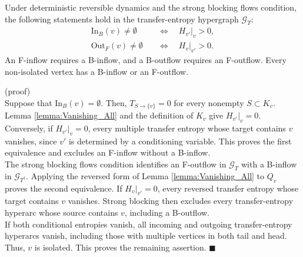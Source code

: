 \documentclass{comnet}%
\begin{document}
\begin{proposition}
 Under deterministic reversible dynamics and the strong blocking flows condition, the following statements hold in the transfer-entropy hypergraph $\mathcal G_T$:
\begin{equation}\begin{aligned}\label{eq:Local_Support}
 \text{In}_B(v)\ne\emptyset &\quad\Longleftrightarrow\quad H_{v'}|_v>0,\\
 \text{Out}_F(v)\ne\emptyset &\quad\Longleftrightarrow\quad H_v|_{v'}>0.
\end{aligned}\end{equation}
An F-inflow requires a B-inflow, and a B-outflow requires an F-outflow. Every non-isolated vertex has a B-inflow or an F-outflow.
 \label{prop:Strong_Blocking_Requirement}\end{proposition}
(proof)\\
Suppose that $\text{In}_B(v)=\emptyset$. Then, $T_{S\to\{v\}}=0$ for every nonempty $S\subset K_v$. Lemma \ref{lemma:Vanishing_All} and the definition of $K_v$ give $H_{v'}|_v=0$. Conversely, if $H_{v'}|_v=0$, every multiple transfer entropy whose target contains $v$ vanishes, since $v'$ is determined by a conditioning variable. This proves the first equivalence and excludes an F-inflow without a B-inflow.\\
The strong blocking flows condition identifies an F-outflow in $\mathcal G_T$ with a B-inflow in $\mathcal G_{T^{\dagger}}$. Applying the reversed form of Lemma \ref{lemma:Vanishing_All} to $Q_v$ proves the second equivalence. If $H_v|_{v'}=0$, every reversed transfer entropy whose target contains $v$ vanishes. Strong blocking then excludes every transfer-entropy hyperarc whose source contains $v$, including a B-outflow.\\
If both conditional entropies vanish, all incoming and outgoing transfer-entropy hyperarcs vanish, including those with multiple vertices in both tail and head. Thus, $v$ is isolated. This proves the remaining assertion. $\blacksquare$\\
\end{document}
